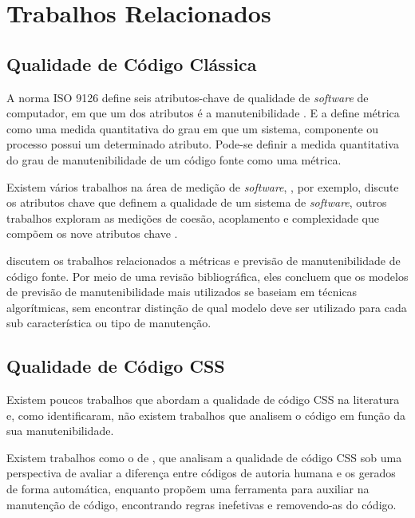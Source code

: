%
%

\chapter{Trabalhos Relacionados}

\section{Qualidade de Código Clássica}

A norma ISO 9126 define seis atributos-chave de qualidade de \textit{software} de computador, em que um dos atributos é a manutenibilidade \cite{Pressman:2010}. E a  define métrica como uma medida quantitativa do grau em que um sistema, componente ou processo possui um determinado atributo. Pode-se definir a medida quantitativa do grau de manutenibilidade de um código fonte como uma métrica.

Existem vários trabalhos na área de medição de \textit{software}, , por exemplo, discute os atributos chave que definem a qualidade de um sistema de \textit{software}, outros trabalhos exploram as medições de coesão, acoplamento e complexidade que compõem os nove atributos chave \cite{McCabe:1989,Zuse:1991,Bieman1994,Dhama:1995,Zuse:1997} .

 discutem os trabalhos relacionados a métricas e previsão de manutenibilidade de código fonte. Por meio de uma revisão bibliográfica, eles concluem que os modelos de previsão de manutenibilidade mais utilizados se baseiam em técnicas algorítmicas, sem encontrar distinção de qual modelo deve ser utilizado para cada sub característica ou tipo de manutenção.

\section{Qualidade de Código CSS}

Existem poucos trabalhos que abordam a qualidade de código CSS na literatura e, como  identificaram, não existem trabalhos que analisem o código em função da sua manutenibilidade.

Existem trabalhos como o de , que analisam a qualidade de código CSS sob uma perspectiva de avaliar a diferença entre códigos de autoria humana e os gerados de forma automática, enquanto  propõem uma ferramenta para auxiliar na manutenção de código, encontrando regras inefetivas e removendo-as do código.

